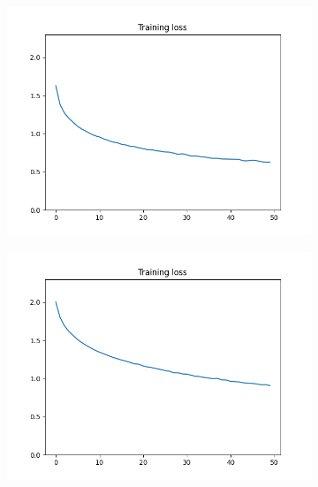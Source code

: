 \documentclass[12pt]{article}
\begin{document}
\begin{figure}
\begin{subfigure}{0.19\textwidth}
    \includegraphics[width=\linewidth]{loss_2_3_bs4.png}
    \caption{}
    \label{fig:3_lr1e-2}
  \end{subfigure}
  \begin{subfigure}{0.19\textwidth}
    \centering
    \includegraphics[width=\linewidth]{loss_3_lr1e-4.png}
    \caption{}
    \label{fig:3_lr1e-4}
  \end{subfigure}
  \begin{subfigure}{0.19\textwidth}
    \centering

\end{subfigure}
\end{figure}
\end{document}
